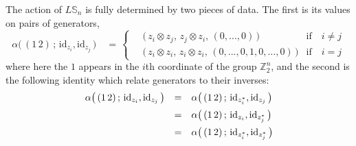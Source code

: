 \documentclass{amsbook} %
\numberwithin{section}{chapter}
\begin{document}
\begin{prop} The action of $L\mathbb{S}_n$ is fully determined by two pieces of data. The first is its values on pairs of generators,
\[ \alpha\big( \, (1 \, 2) \, ; \, \mathrm{id}_{z_i}, \mathrm{id}_{z_j} \, \big) \quad = \, 
		\begin{cases}
			\quad \big( \, z_i \otimes z_j, \, z_j \otimes z_i, \, (0, ..., 0) \, \big) & \text{if} \quad i \neq j \\
			\quad \big( \, z_i \otimes z_i, \, z_i \otimes z_i, \, (0,...,0, 1, 0,...,0) \, \big) & \text{if} \quad i = j
		\end{cases} 
\]
where here the $1$ appears in the $i$th coordinate of the group $\mathbb{Z}_2^{n}$, and the second is the following identity which relate generators to their inverses:
\[ \begin{array}{rll} 
			\alpha\big( \, (1 \, 2) \, ; \, \mathrm{id}_{z_i}, \mathrm{id}_{z_j} \, \big) & = & \alpha\big( \, (1 \, 2) \, ; \, \mathrm{id}_{z_i^*}, \mathrm{id}_{z_j} \, \big) \\[\medskipamount]
			& = & \alpha\big( \, (1 \, 2) \, ; \, \mathrm{id}_{z_i}, \mathrm{id}_{z_j^*} \, \big) \\[\medskipamount]
			& = & \alpha\big( \, (1 \, 2) \, ; \, \mathrm{id}_{z_i^*}, \mathrm{id}_{z_j^*} \, \big)
		\end{array}
\]
\end{prop}
\end{document}
